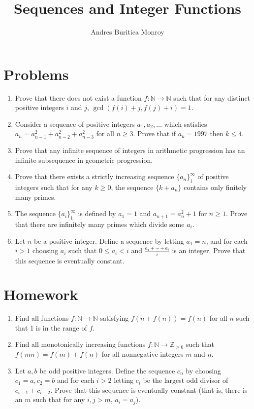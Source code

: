 \documentclass{article}
\title{Sequences and Integer Functions}
\author{Andres Buritica Monroy}
\date{}
\newcommand\Nn{\mathbb{N}}
\newcommand\Zz{\mathbb{Z}}
\begin{document}
\maketitle
\section{Problems}
\begin{enumerate}
	\item Prove that there does not exist a function $f:\Nn\to\Nn$
	      such that for any distinct positive integers $i$ and $j$,
	      $\gcd(f(i)+j,f(j)+i)=1$.
	\item Consider a sequence of positive integers $a_1,a_2,\ldots$ which satisfies
	      $a_n=a_{n-1}^2+a_{n-2}^2+a_{n-3}^2$ for all $n\ge 3$. Prove that if
	      $a_k=1997$ then $k\le 4$.
	\item Prove that any infinite sequence of integers in arithmetic progression has an
	      infinite subsequence in geometric progression.
	\item Prove that there exists a strictly increasing sequence $\{a_n\}_1^\infty$
	      of positive integers such that for any $k\ge 0$, the sequence $\{k+a_n\}$
	      contains only finitely many primes.
	\item The sequence $\{a_i\}_1^\infty$ is defined by $a_1 = 1$ and
	      $a_{n+1}=a_n^2+1$ for $n\ge 1$. Prove that there are infinitely many primes
	      which divide some $a_i$.
	\item Let $n$ be a positive integer. Define a sequence by letting $a_1=n$, and
	      for each $i>1$ choosing $a_i$ such that $0\le a_i<i$ and
	      $\frac{a_1+\cdots+a_i}i$ is an integer. Prove that this sequence is
	      eventually constant.
\end{enumerate}
\newpage
\section{Homework}
\begin{enumerate}
	\item Find all functions $f:\Nn\to\Nn$ satisfying $f(n+f(n))=f(n)$ for all
	      $n$ such that 1 is in the range of $f$.
	\item Find all monotonically increasing functions $f:\Nn\to\Zz_{\ge 0}$ such that $f(mn)=f(m)+f(n)$ for
	      all nonnegative integers $m$ and $n$.
	\item Let $a,b$ be odd positive integers. Define the sequence $c_n$ by
	      choosing $c_1=a,c_2=b$ and for each $i>2$ letting $c_i$ be the largest odd
	      divisor of $c_{i-1}+c_{i-2}$. Prove that this sequence is eventually
	      constant
	      (that is, there is an $m$ such that for any $i,j>m$, $a_i=a_j$).
\end{enumerate}
\end{document}
